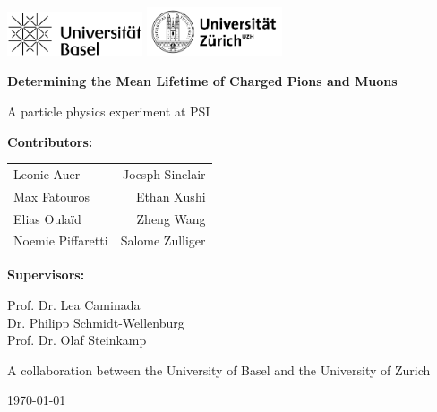 \documentclass[11pt,a4paper]{article}
\begin{document}
\begin{titlepage}
    \centering
    

    \includegraphics[width=0.3\textwidth]{uba.png}
    \hfill
    \includegraphics[width=0.3\textwidth]{uzh.png}
    
    \vspace{2cm}
    {\huge\bfseries Determining the Mean Lifetime of Charged Pions and Muons}
    \vspace{1.5cm}
    
    {\Large A particle physics experiment at PSI\par}
    \vspace{2cm}
    
    {\Large \textbf{Contributors:} \par}
    \vspace{0.5cm}
    \begin{tabular}{l r}
        Leonie Auer &  Joesph Sinclair \\
        Max Fatouros & Ethan Xushi \\
        Elias Oulaïd & Zheng Wang \\
       Noemie Piffaretti& Salome Zulliger \\
    \end{tabular}
    
    \vspace{2cm}
    
  
    {\Large \textbf{Supervisors:} \par}
    \vspace{0.5cm}
    Prof. Dr. Lea Caminada \\
    Dr. Philipp Schmidt-Wellenburg \\
     Prof. Dr. Olaf Steinkamp \\
    
    \vfill
    

    {\large A collaboration between the University of Basel and the University of Zurich \par}
    \vspace{0.5cm}
    {\large \today \par}
\end{titlepage}
\end{document}
